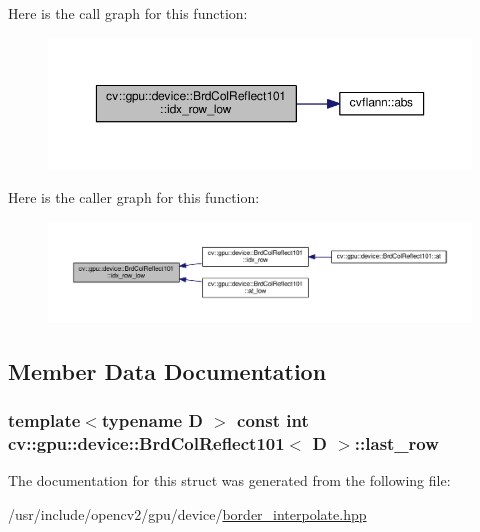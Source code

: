 Here is the call graph for this function\-:\nopagebreak
\begin{figure}[H]
\begin{center}
\leavevmode
\includegraphics[width=350pt]{structcv_1_1gpu_1_1device_1_1BrdColReflect101_ad88211682b56ad96312a9cea8eb9201d_cgraph}
\end{center}
\end{figure}




Here is the caller graph for this function\-:\nopagebreak
\begin{figure}[H]
\begin{center}
\leavevmode
\includegraphics[width=350pt]{structcv_1_1gpu_1_1device_1_1BrdColReflect101_ad88211682b56ad96312a9cea8eb9201d_icgraph}
\end{center}
\end{figure}




\subsection{Member Data Documentation}
\hypertarget{structcv_1_1gpu_1_1device_1_1BrdColReflect101_a1a0c12421697d92d8fa5c0f16bc64457}{
\subsubsection[{last\-\_\-row}]{\setlength{\rightskip}{0pt plus 5cm}template$<$typename D $>$ const int {\bf cv\-::gpu\-::device\-::\-Brd\-Col\-Reflect101}$<$ D $>$\-::last\-\_\-row}}\label{structcv_1_1gpu_1_1device_1_1BrdColReflect101_a1a0c12421697d92d8fa5c0f16bc64457}


The documentation for this struct was generated from the following file\-:\begin{DoxyCompactItemize}
\item 
/usr/include/opencv2/gpu/device/\hyperlink{border__interpolate_8hpp}{border\-\_\-interpolate.\-hpp}\end{DoxyCompactItemize}
